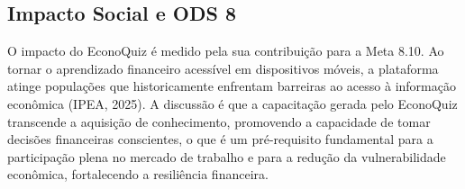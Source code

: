 \documentclass[12pt,a4paper]{article}
\begin{document}
\subsection{Impacto Social e ODS 8}

O impacto do EconoQuiz é medido pela sua contribuição para a Meta 8.10. Ao tornar o aprendizado financeiro acessível em dispositivos móveis, a plataforma atinge populações que historicamente enfrentam barreiras ao acesso à informação econômica (IPEA, 2025). A discussão é que a capacitação gerada pelo EconoQuiz transcende a aquisição de conhecimento, promovendo a capacidade de tomar decisões financeiras conscientes, o que é um pré-requisito fundamental para a participação plena no mercado de trabalho e para a redução da vulnerabilidade econômica, fortalecendo a resiliência financeira.
\end{document}
